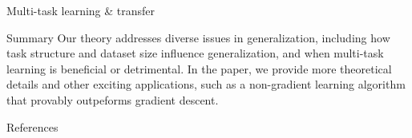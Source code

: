 \documentclass[final]{beamer}
\begin{document}
\begin{frame}[t]{}
\begin{columns}
\begin{column}[t]{0.248\textwidth}
\begin{block}{\large Multi-task learning \& transfer}
\begin{figure}
\end{figure}
\end{block}
\begin{block}{\large Summary}
\vspace{-0.5em}
Our theory addresses diverse issues in generalization, including how task structure and dataset size influence generalization, and when multi-task learning is beneficial or detrimental. In the paper, we provide more theoretical details and other exciting applications, such as a non-gradient learning algorithm that provably outpeforms gradient descent. 
\end{block}

\begin{block}{\large References}
\vspace{-0.5em}
{
\tiny


}
\end{block}
\end{column}
\end{columns}
\end{frame}
\end{document}

